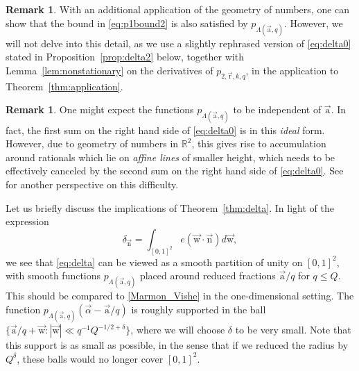 \documentclass[letterpaper,11pt]{amsart}
\numberwithin{equation}{section}
\theoremstyle{definition}
\newtheorem{remark}[theorem]{Remark}
\numberwithin{equation}{section}
\newcommand{\RR}{\mathbb{R}}
\newcommand{\ua}{\vec{\mathrm{a}}}
\newcommand{\ur}{\vec{\mathrm{r}}}
\newcommand{\uw}{{\vec{\mathrm{w}}}}
\newcommand{\ualf}{\vec{\alpha}}
\newcommand{\nn}{\vec{\mathrm{n}}}
\begin{document}
\begin{remark}\label{rem:decay}
	With an additional application of the geometry of numbers, one can show that the bound in \eqref{eq:p1bound2} is also satisfied by $p_{\Lambda(\ua, q)}$. However, we will not delve into this detail, as 
    we use a slightly rephrased version of \eqref{eq:delta0} stated in Proposition~\ref{prop:delta2} below, together with Lemma~\ref{lem:nonstationary} on the derivatives of  $p_{2,\ur,k,q} $, in the application to Theorem~\ref{thm:application}.  
\end{remark}

\begin{remark}
    \label{rem:HBQ}
    One might expect the functions $p_{\Lambda(\ua, q)}$ to be independent of $\ua$.  In fact, the first sum on the right hand side of \eqref{eq:delta0} is in this {\em ideal} form. However, due to geometry of numbers in $\RR^2$, this gives rise to accumulation around rationals which lie on {\em affine lines} of smaller height, which needs to be effectively canceled by the second sum on the right hand side of \eqref{eq:delta0}. See 
\cite[comments after (1.17)]{HBP} for another perspective on this difficulty.
    
    
\end{remark}

Let us briefly discuss the implications of Theorem~\ref{thm:delta}. 
In light of the expression
\begin{equation*}%
\delta_{\nn}=\int_{[0,1]^2}e(\uw\cdot\nn)d\uw,
\end{equation*} 
we see that \eqref{eq:delta} can be viewed as a smooth partition of unity on $[0,1]^2$, with smooth functions $p_{\Lambda(\ua, q)}$ placed around reduced fractions $\ua/q$ for $q\leq Q$. This should be compared to \eqref{Marmon_Vishe} in the one-dimensional setting. The function $p_{\Lambda(\ua, q)}(\ualf-\ua/q)$ is roughly supported in the ball $\{\ua/q+\uw:|\uw|\ll  q^{-1}Q^{-1/2+\delta}\}$, where we will choose $\delta $ to be very small. Note that this support is as small as possible, in the sense that if we reduced the radius by $Q^\delta$, these balls would no longer cover $[0,1]^2$.
\end{document}
